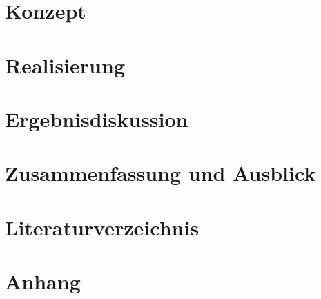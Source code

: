 \documentclass[a4paper, 12pt]{scrartcl}
\begin{document}
    \section{Konzept}
    
    
    \section{Realisierung}
    
    
    \section{Ergebnisdiskussion}
    
    
    \section{Zusammenfassung und Ausblick}
    
 
  	\newpage
	\section{Literaturverzeichnis}
	\nocite{*}
	\renewcommand{\refname}{}
	\printbibliography
 
 	\newpage
 	\appendix
 	\section{Anhang}
 	\renewcommand{\thesection}{\Alph{section}}
 	
 
	\newpage
	
\end{document}
